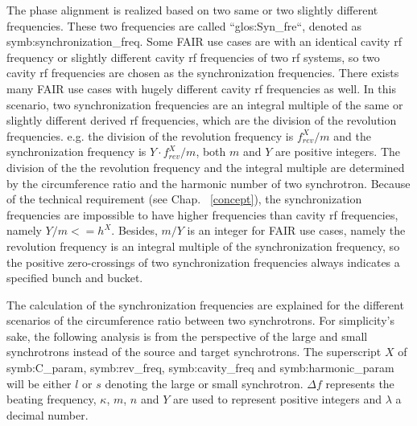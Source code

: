 The phase alignment is realized based on two same or two slightly different frequencies. These two frequencies are called ``\gls{glos:Syn_fre}``, denoted as \gls{symb:synchronization_freq}. Some FAIR use cases are with an identical cavity rf frequency or slightly different cavity rf frequencies of two rf systems, so two cavity rf frequencies are chosen as the synchronization frequencies. There exists many FAIR use cases with hugely different cavity rf frequencies as well. In this scenario, two synchronization frequencies are an integral multiple of the same or slightly different derived rf frequencies, which are the division of the revolution frequencies. e.g. the division of the revolution frequency is $f_\mathit{rev}^{X}/m$ and the synchronization frequency is $Y\cdot f_\mathit{rev}^{X}/m$, both $m$ and $Y$ are positive integers. The division of the the revolution frequency and the integral multiple are determined by the circumference ratio and the harmonic number of two synchrotron. Because of the technical requirement (see Chap. ~\ref{concept}), the synchronization frequencies are impossible to have higher frequencies than cavity rf frequencies, namely $Y/m <=h^X$. Besides, $m/Y$ is an integer for FAIR use cases, namely the revolution frequency is an integral multiple of the synchronization frequency, so the positive zero-crossings of two synchronization frequencies always indicates a specified bunch and bucket.

The calculation of the synchronization frequencies are explained for the different scenarios of the circumference ratio between two synchrotrons. For simplicity's sake, the following analysis is from the perspective of the large and small synchrotrons instead of the source and target synchrotrons. The superscript $X$ of \gls{symb:C_param}, \gls{symb:rev_freq}, \gls{symb:cavity_freq} and \gls{symb:harmonic_param} will be either $l$ or $s$ denoting the large or small synchrotron. $\Delta f$ represents the beating frequency, $\kappa$, $m$, $n$ and $Y$ are used to represent positive integers and $\lambda$ a decimal number.

%
 


